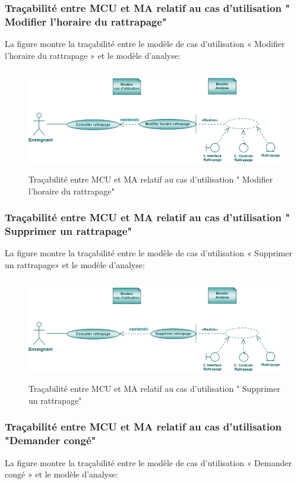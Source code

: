 \documentclass[12 pt]{report}
\begin{document}
\subsubsection{Traçabilité entre MCU et MA relatif au cas d’utilisation " Modifier l'horaire du rattrapage" }
La figure  montre la traçabilité entre le modèle de cas d’utilisation « Modifier l'horaire du rattrapage » et le modèle d’analyse:

\begin{figure}[h]
\begin{center}
\includegraphics[width= 14cm , height =4.5cm]{tmh.PNG}
\caption{Traçabilité entre MCU et MA relatif au cas d’utilisation " Modifier l'horaire du rattrapage"}
\end{center}
\end{figure} 
\subsubsection{Traçabilité entre MCU et MA relatif au cas d’utilisation " Supprimer un rattrapage" }
La figure  montre la traçabilité entre le modèle de cas d’utilisation « Supprimer un rattrapage» et le modèle d’analyse:

\begin{figure}[h]
\begin{center}
\includegraphics[width= 14cm , height =4.5cm]{tsr.PNG}
\caption{Traçabilité entre MCU et MA relatif au cas d’utilisation " Supprimer un rattrapage"}
\end{center}
\end{figure} 
\subsubsection{Traçabilité entre MCU et MA relatif au cas d’utilisation "Demander congé" }
La figure  montre la traçabilité entre le modèle de cas d’utilisation « Demander congé » et le modèle d’analyse:
\end{document}
